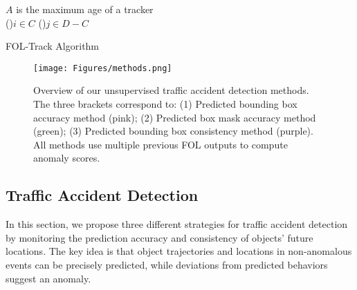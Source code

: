 \documentclass[letterpaper, 10 pt, conference]{ieeeconf}
\theoremstyle{definition}
\theoremstyle{remark}
\begin{document}
\vspace{-4pt}
\begin{algorithm}
    $A$ is the maximum age of a tracker \\
	\For(){$i\in C$}{
	}
	\For(){$j\in D - C$}{
	}		   
	\caption{FOL-Track Algorithm}
	\label{alg:fol_track}
\end{algorithm}
\vspace{-8pt}

\begin{figure*}
    \vspace{5pt}
    \centering
    \texttt{[image: Figures/methods.png]}
    \caption{
        Overview of our unsupervised traffic accident detection methods. The three brackets correspond to: (1) Predicted bounding box accuracy method (pink); (2) Predicted box mask accuracy method (green); (3) Predicted bounding box consistency method (purple). All methods use multiple previous FOL outputs to compute anomaly scores.
    }
    \label{fig:metrics}
    \vspace{-12pt}
\end{figure*}

\subsection{Traffic Accident Detection}
\label{sec:metrics}
In this section, we propose three different strategies for traffic
accident detection by monitoring the prediction accuracy and consistency
of objects' future locations. The key idea is that object trajectories
and locations in non-anomalous events can be precisely predicted,
while deviations from predicted behaviors suggest an anomaly.
\end{document}
